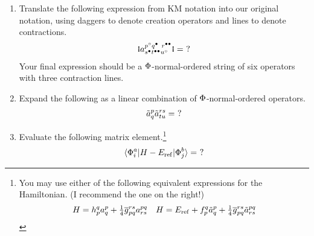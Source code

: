 \documentclass[11pt]{article}
\numberwithin{equation}{section}
\begin{document}
\begin{enumerate}
\item
  Translate the following expression from KM notation into our original notation, using daggers to denote creation operators and lines to denote contractions.
\begin{align*}
  \gno{
    a^{p^\hole q^{\ptcl\phantom{\ptcl}} r^{\ptcl\ptcl}}
     _{s^\ptcl t^{\ptcl\ptcl} u^\hole}
  }
=
  \,\,?
\end{align*}
  Your final expression should be a $\Phi $-normal-ordered string of six operators with three contraction lines.

\newpage
\item
Expand the following as a linear combination of $\Phi $-normal-ordered operators.
\begin{align*}
  \tilde{a}^p_q
  \tilde{a}^{rs}_{tu}
=
  \,\,?
\end{align*}


\newpage
\item
Evaluate the following matrix element.\footnote{You may use either of the following equivalent expressions for the Hamiltonian. (I recommend the one on the right!)
\begin{align*}
  H
=
  h_p^q
  a^p_q
+
  \tfrac{1}{4}
  \overline{g}_{pq}^{rs}
  a^{pq}_{rs}
&&
  H
=
  E_{\mathrm{ref}}
+
  f_p^q
  \tilde{a}^p_q
+
  \tfrac{1}{4}
  \overline{g}_{pq}^{rs}
  \tilde{a}^{pq}_{rs}
\end{align*}
}
\begin{align*}
  \langle\Phi _i^a|H - E_{\mathrm{ref}}|\Phi _j^b\rangle
=
  \,\,?
\end{align*}
\end{enumerate}
\end{document}

